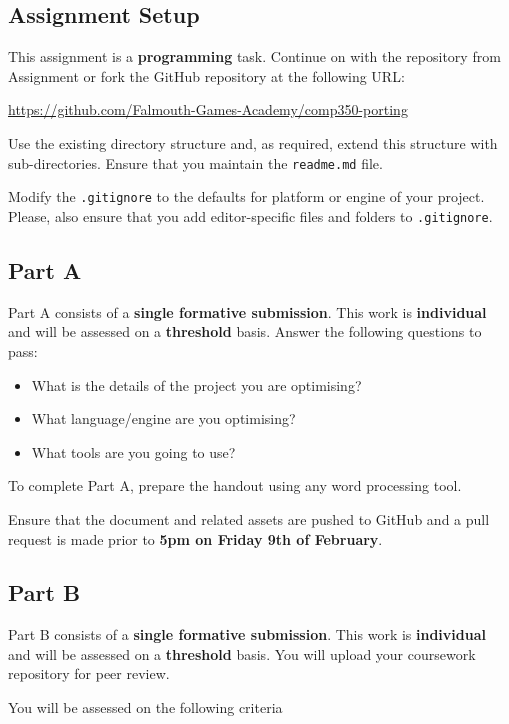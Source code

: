 \documentclass{../../fal_assignment}
\begin{document}
\subsection*{Assignment Setup}

This assignment is a \textbf{programming} task. Continue on with the repository from Assignment or fork the GitHub repository at the following URL:

\indent \url{https://github.com/Falmouth-Games-Academy/comp350-porting}

Use the existing directory structure and, as required, extend this structure with sub-directories.
Ensure that you maintain the \texttt{readme.md} file.

Modify the \texttt{.gitignore} to the defaults for platform or engine of your project.
Please, also ensure that you add editor-specific files and folders to \texttt{.gitignore}. 

\subsection*{Part A}

Part A consists of a \textbf{single formative submission}. This work is \textbf{individual} and will be assessed on a \textbf{threshold} basis. Answer the following questions to pass:

\begin{itemize}
	\item What is the details of the project you are optimising?
	\item What language/engine are you optimising?
	\item What tools are you going to use?
\end{itemize}

To complete Part A, prepare the handout using any word processing tool.

Ensure that the document and related assets are pushed to GitHub and a pull request is made prior to \textbf{5pm on Friday 9th of February}.

\subsection*{Part B}

Part B consists of a \textbf{single formative submission}. This work is \textbf{individual} and will be assessed on a \textbf{threshold} basis. You will upload your coursework repository for peer review.

You will be assessed on the following criteria 
\end{document}

